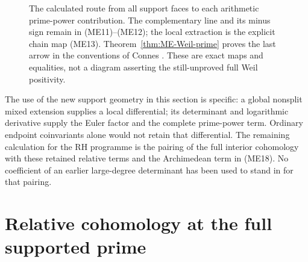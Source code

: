 \documentclass[11pt,a4paper]{article}
\theoremstyle{definition}\newtheorem{definition}[theorem]{Definition}
\newcommand{\C}{\mathbb C}\newcommand{\R}{\mathbb R}
\begin{document}
\begin{figure}[ht]
\centering
{}
\caption{The calculated route from all support faces to each arithmetic
prime-power contribution. The complementary line and its minus sign remain
in (ME11)--(ME12); the local extraction is the explicit chain map (ME13).
Theorem~\ref{thm:ME-Weil-prime} proves the last arrow in the conventions of
Connes \cite{Connes1998,Connes2026}. These are exact maps and equalities,
not a diagram asserting the still-unproved full Weil positivity.}
\end{figure}

The use of the new support geometry in this section is specific: a global
nonsplit mixed extension supplies a local differential; its determinant
and logarithmic derivative supply the Euler factor and the complete
prime-power term. Ordinary endpoint coinvariants alone would not retain
that differential. The remaining calculation for the RH programme is the
pairing of the full interior cohomology with these retained relative terms
and the Archimedean term in (ME18). No coefficient of an earlier large-degree
determinant has been used to stand in for that pairing.



\section{Relative cohomology at the full supported prime}\label{sec:relative-prime-recollement}
\end{document}

